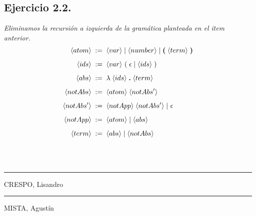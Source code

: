 \documentclass[a4paper,10pt]{article}
\begin{document}
\subsection*{Ejercicio 2.2.}
	\emph{Eliminamos la recursión a izquierda de la gramática planteada en el item anterior.}
	\\
	\begin{alignat*}{3}
			\langle atom \rangle \; &:= \; \langle var \rangle\; | \;\langle number \rangle\; | \;{\textbf (} \; \langle term \rangle \; {\textbf )}\\[0.5em]
		\langle ids \rangle \; &:= \; \langle var \rangle\ ( \; \epsilon\; | \; \langle ids \rangle \; )\\[0.5em]
		\langle abs \rangle \; &:= \; \lambda \;\langle ids \rangle\; {\textbf .}\; \langle term \rangle \\[0.5em]
		\langle notAbs \rangle \; &:= \; \langle atom \rangle\; \langle notAbs' \rangle \\[0.5em]
		\langle notAbs' \rangle \; &:= \; \langle notApp \rangle \; \langle notAbs' \rangle \; |\ \epsilon  \\[0.5em]
		\langle notApp \rangle \; &:= \; \langle atom \rangle\; | \; \langle abs \rangle \\[0.5em]
		\langle term \rangle \; &:= \; \langle abs \rangle\; | \;\langle notAbs \rangle \\[0.5em]
	\end{alignat*}
\\
\\
\vspace{\fill}
\begin{multicols}{2}
	\hrule
	\vspace{5pt}
	CRESPO, Lisandro \\
	\linebreak

	\hrule
	\vspace{5pt}
	MISTA, Agustín \\
\end{multicols}
\end{document}
